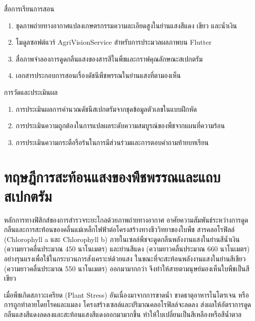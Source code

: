 \begin{planbox}{สื่อการเรียนการสอน}
\begin{enumerate}
    \item ชุดภาพถ่ายทางอากาศแปลงเกษตรกรรมความละเอียดสูงในย่านแสงสีแดง เขียว และน้ำเงิน
    \item โมดูลซอฟต์แวร์ AgriVisionService สำหรับการประมวลผลภาพบน Flutter
    \item สื่อภาพจำลองการดูดกลืนแสงของสารสีในพืชและกราฟคุณลักษณะสเปกตรัม
    \item เอกสารประกอบการสอนเรื่องดัชนีพืชพรรณในย่านแสงที่ตามองเห็น
\end{enumerate}
\end{planbox}

\begin{planbox}{การวัดและประเมินผล}
\begin{enumerate}
    \item การประเมินผลการคำนวณดัชนีสเปกตรัมจากชุดข้อมูลตัวเลขในแบบฝึกหัด
    \item การประเมินความถูกต้องในการแปลผลระดับความสมบูรณ์ของพืชจากแผนที่ความร้อน
    \item การประเมินความกระตือรือร้นในการมีส่วนร่วมและการตอบคำถามท้ายบทเรียน
\end{enumerate}
\end{planbox}

\clearpage

\section{ทฤษฎีการสะท้อนแสงของพืชพรรณและแถบสเปกตรัม}

หลักการทางฟิสิกส์ของการสำรวจระยะไกลด้วยภาพถ่ายทางอากาศ อาศัยความสัมพันธ์ระหว่างการดูดกลืนและการสะท้อนของคลื่นแม่เหล็กไฟฟ้าต่อโครงสร้างทางชีววิทยาของใบพืช สารคลอโรฟิลล์ (Chlorophyll a และ Chlorophyll b) ภายในเซลล์พืชจะดูดกลืนพลังงานแสงในย่านสีน้ำเงิน (ความยาวคลื่นประมาณ 450 นาโนเมตร) และย่านสีแดง (ความยาวคลื่นประมาณ 660 นาโนเมตร) อย่างรุนแรงเพื่อใช้ในกระบวนการสังเคราะห์ด้วยแสง ในขณะที่จะสะท้อนพลังงานแสงในย่านสีเขียว (ความยาวคลื่นประมาณ 550 นาโนเมตร) ออกมามากกว่า จึงทำให้สายตามนุษย์มองเห็นใบพืชเป็นสีเขียว

เมื่อพืชเกิดสภาวะเครียด (Plant Stress) อันเนื่องมาจากการขาดน้ำ ขาดธาตุอาหารไนโตรเจน หรือการถูกทำลายโดยโรคและแมลง โครงสร้างเซลล์และปริมาณคลอโรฟิลล์จะลดลง ส่งผลให้อัตราการดูดกลืนแสงสีแดงลดลงและสะท้อนแสงสีแดงออกมามากขึ้น ทำให้ใบเปลี่ยนเป็นสีเหลืองหรือสีน้ำตาล

